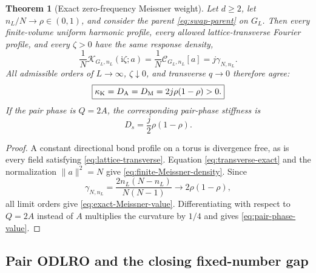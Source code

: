 \documentclass[11pt]{article}
\newtheorem{theorem}{Theorem}[section]
\theoremstyle{definition}
\theoremstyle{remark}
\newcommand{\cK}{\mathcal K}
\newcommand{\cC}{\mathcal C}
\newcommand{\I}{\mathrm i}
\newcommand{\norm}[1]{\lVert #1\rVert}
\begin{document}
\begin{theorem}[Exact zero-frequency Meissner weight]
\label{thm:exact-Meissner}
Let $d\ge2$, let $n_L/N\to\rho\in(0,1)$, and consider the parent \eqref{eq:swap-parent} on $G_L$.
Then every finite-volume uniform harmonic profile, every allowed lattice-transverse Fourier profile, and
every $\zeta>0$ have the same response density,
\begin{equation}
 \frac1N\cK_{G_L,n_L}(\I\zeta;a)
 =\frac1N\cC_{G_L,n_L}[a]
 =j\gamma_{N,n_L}.
 \label{eq:finite-Meissner-density}
\end{equation}
All admissible orders of $L\to\infty$, $\zeta\downarrow0$, and transverse $q\to0$ therefore agree:
\begin{equation}
 \boxed{
 \kappa_{\rm K}=D_{\rm A}=D_{\rm M}=2j\rho(1-\rho)>0.}
 \label{eq:exact-Meissner-value}
\end{equation}
If the pair phase is $Q=2A$, the corresponding pair-phase stiffness is
\begin{equation}
 \boxed{D_s=\frac j2\rho(1-\rho).}
 \label{eq:pair-phase-value}
\end{equation}
\end{theorem}

\begin{proof}
A constant directional bond profile on a torus is divergence free, as is every field satisfying
\eqref{eq:lattice-transverse}.  Equation \eqref{eq:transverse-exact} and the normalization
$\norm a^2=N$ give \eqref{eq:finite-Meissner-density}.  Since
\begin{equation}
 \gamma_{N,n_L}=\frac{2n_L(N-n_L)}{N(N-1)}\longrightarrow2\rho(1-\rho),
\end{equation}
all limit orders give \eqref{eq:exact-Meissner-value}.  Differentiating with respect to $Q=2A$ instead of
$A$ multiplies the curvature by $1/4$ and gives \eqref{eq:pair-phase-value}.
\end{proof}

\subsection{Pair ODLRO and the closing fixed-number gap}
\end{document}
